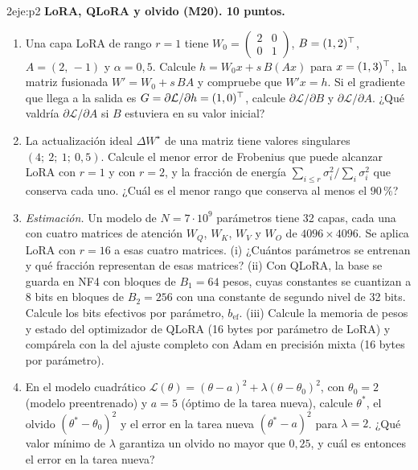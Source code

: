 \begin{ejercicio}{2}{eje:p2}
\textbf{LoRA, QLoRA y olvido (M20). 10 puntos.}
\begin{enumerate}[label=(\alph*)]
  \item {} Una capa LoRA de rango $r=1$ tiene $W_0=\begin{pmatrix}2&0\\0&1\end{pmatrix}$, $B=(1,2)^{\top}$, $A=(2,\,-1)$ y $\alpha=0{,}5$. Calcule $h=W_0x+s\,B(Ax)$ para $x=(1,3)^{\top}$, la matriz fusionada $W'=W_0+s\,BA$ y compruebe que $W'x=h$. Si el gradiente que llega a la salida es $G=\partial\mathcal{L}/\partial h=(1,0)^{\top}$, calcule $\partial\mathcal{L}/\partial B$ y $\partial\mathcal{L}/\partial A$. ¿Qué valdría $\partial\mathcal{L}/\partial A$ si $B$ estuviera en su valor inicial?
  \item {} La actualización ideal $\Delta W^{\star}$ de una matriz tiene valores singulares $(4;\ 2;\ 1;\ 0{,}5)$. Calcule el menor error de Frobenius que puede alcanzar LoRA con $r=1$ y con $r=2$, y la fracción de energía $\sum_{i\le r}\sigma_i^{2}/\sum_i\sigma_i^{2}$ que conserva cada uno. ¿Cuál es el menor rango que conserva al menos el $90\,\%$?
  \item {} \emph{Estimación.} Un modelo de $N=7\cdot 10^{9}$ parámetros tiene 32 capas, cada una con cuatro matrices de atención $W_Q$, $W_K$, $W_V$ y $W_O$ de $4096\times 4096$. Se aplica LoRA con $r=16$ a esas cuatro matrices. (i) ¿Cuántos parámetros se entrenan y qué fracción representan de esas matrices? (ii) Con QLoRA, la base se guarda en NF4 con bloques de $B_1=64$ pesos, cuyas constantes se cuantizan a 8 bits en bloques de $B_2=256$ con una constante de segundo nivel de 32 bits. Calcule los bits efectivos por parámetro, $b_{\mathrm{ef}}$. (iii) Calcule la memoria de pesos y estado del optimizador de QLoRA (16 bytes por parámetro de LoRA) y compárela con la del ajuste completo con Adam en precisión mixta (16 bytes por parámetro).
  \item {} En el modelo cuadrático $\mathcal{L}(\theta)=(\theta-a)^{2}+\lambda(\theta-\theta_0)^{2}$, con $\theta_0=2$ (modelo preentrenado) y $a=5$ (óptimo de la tarea nueva), calcule $\theta^{\ast}$, el olvido $(\theta^{\ast}-\theta_0)^{2}$ y el error en la tarea nueva $(\theta^{\ast}-a)^{2}$ para $\lambda=2$. ¿Qué valor mínimo de $\lambda$ garantiza un olvido no mayor que $0{,}25$, y cuál es entonces el error en la tarea nueva?
\end{enumerate}
\end{ejercicio}

